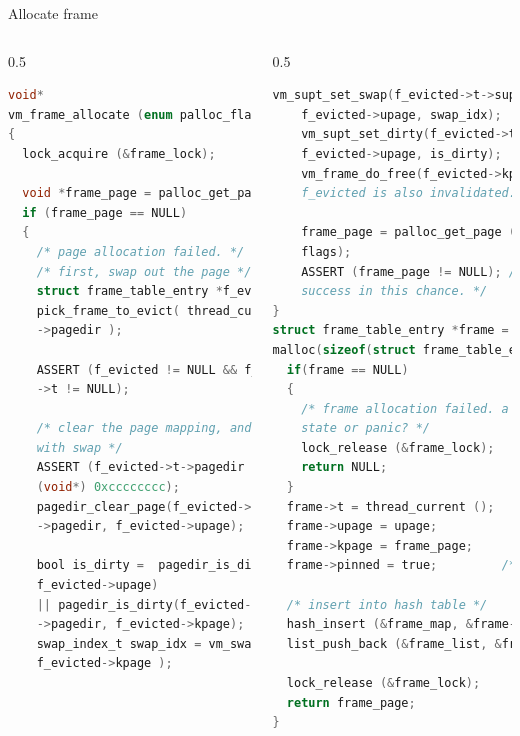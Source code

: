 \documentclass[10pt]{beamer}
\begin{document}
\begin{frame}[fragile]{Allocate frame}
\begin{columns}
\begin{column}{0.5\textwidth}
\begin{lstlisting}[language=C]
void*
vm_frame_allocate (enum palloc_flags flags, void *upage)
{
  lock_acquire (&frame_lock);

  void *frame_page = palloc_get_page (PAL_USER | flags);
  if (frame_page == NULL) 
  {
    /* page allocation failed. */
    /* first, swap out the page */
    struct frame_table_entry *f_evicted =
    pick_frame_to_evict( thread_current()
    ->pagedir );

    ASSERT (f_evicted != NULL && f_evicted
    ->t != NULL);

    /* clear the page mapping, and replace it 
    with swap */
    ASSERT (f_evicted->t->pagedir != 
    (void*) 0xcccccccc);
    pagedir_clear_page(f_evicted->t
    ->pagedir, f_evicted->upage);

    bool is_dirty =  pagedir_is_dirty(f_evicted->t->pagedir, 
    f_evicted->upage)
    || pagedir_is_dirty(f_evicted->t
    ->pagedir, f_evicted->kpage);
    swap_index_t swap_idx = vm_swap_out( 
    f_evicted->kpage );
\end{lstlisting}
\end{column}
\begin{column}{0.5\textwidth}
\begin{lstlisting}[language=C]
    vm_supt_set_swap(f_evicted->t->supt, 
    f_evicted->upage, swap_idx);
    vm_supt_set_dirty(f_evicted->t->supt, 
    f_evicted->upage, is_dirty);
    vm_frame_do_free(f_evicted->kpage, true); /**< 
    f_evicted is also invalidated. */

    frame_page = palloc_get_page (PAL_USER | 
    flags);
    ASSERT (frame_page != NULL); /**< should 
    success in this chance. */
}
struct frame_table_entry *frame = 
malloc(sizeof(struct frame_table_entry));
  if(frame == NULL) 
  {
    /* frame allocation failed. a critical 
    state or panic? */
    lock_release (&frame_lock);
    return NULL;
  }
  frame->t = thread_current ();
  frame->upage = upage;
  frame->kpage = frame_page;
  frame->pinned = true;         /**< can't be evicted yet */

  /* insert into hash table */
  hash_insert (&frame_map, &frame->helem);
  list_push_back (&frame_list, &frame->lelem);

  lock_release (&frame_lock);
  return frame_page;
}
\end{lstlisting}
\end{column}
\end{columns}
\end{frame}
\end{document}
